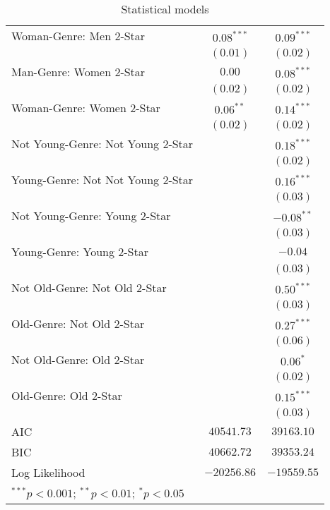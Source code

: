\begin{table}
\begin{center}
\begin{tabular}{l c c}
Woman-Genre: Men 2-Star           & $0.08^{***}$  & $0.09^{***}$  \\
                                  & $(0.01)$      & $(0.02)$      \\
Man-Genre: Women 2-Star           & $0.00$        & $0.08^{***}$  \\
                                  & $(0.02)$      & $(0.02)$      \\
Woman-Genre: Women 2-Star         & $0.06^{**}$   & $0.14^{***}$  \\
                                  & $(0.02)$      & $(0.02)$      \\
Not Young-Genre: Not Young 2-Star &               & $0.18^{***}$  \\
                                  &               & $(0.02)$      \\
Young-Genre: Not Not Young 2-Star &               & $0.16^{***}$  \\
                                  &               & $(0.03)$      \\
Not Young-Genre: Young 2-Star     &               & $-0.08^{**}$  \\
                                  &               & $(0.03)$      \\
Young-Genre: Young 2-Star         &               & $-0.04$       \\
                                  &               & $(0.03)$      \\
Not Old-Genre: Not Old 2-Star     &               & $0.50^{***}$  \\
                                  &               & $(0.03)$      \\
Old-Genre: Not Old 2-Star         &               & $0.27^{***}$  \\
                                  &               & $(0.06)$      \\
Not Old-Genre: Old 2-Star         &               & $0.06^{*}$    \\
                                  &               & $(0.02)$      \\
Old-Genre: Old 2-Star             &               & $0.15^{***}$  \\
                                  &               & $(0.03)$      \\
\hline
AIC                               & $40541.73$    & $39163.10$    \\
BIC                               & $40662.72$    & $39353.24$    \\
Log Likelihood                    & $-20256.86$   & $-19559.55$   \\
\hline
\multicolumn{3}{l}{\scriptsize{$^{***}p<0.001$; $^{**}p<0.01$; $^{*}p<0.05$}}
\end{tabular}
\caption{Statistical models}
\label{table:coefficients}
\end{center}
\end{table}
